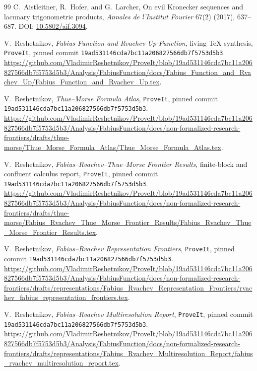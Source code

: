 \documentclass[11pt,oneside]{article}
\numberwithin{equation}{section}
\theoremstyle{definition}
\theoremstyle{remark}
\newcommand{\repo}{\texttt{ProveIt}}
\begin{document}
\begin{thebibliography}{99}
C.~Aistleitner, R.~Hofer, and G.~Larcher,
\newblock On evil Kronecker sequences and lacunary trigonometric products,
\newblock \emph{Annales de l'Institut Fourier} 67(2) (2017), 637--687.
\newblock DOI: \href{https://doi.org/10.5802/aif.3094}{10.5802/aif.3094}.

V.~Reshetnikov,
\newblock \emph{Fabius Function and Rvachev Up-Function}, living TeX synthesis,
\newblock \repo, pinned commit
\nolinkurl{19ad531146cda7bc11a206827566db7f5753d5b3}.
\newblock \url{https://github.com/VladimirReshetnikov/ProveIt/blob/19ad531146cda7bc11a206827566db7f5753d5b3/Analysis/FabiusFunction/docs/Fabius_Function_and_Rvachev_Up/Fabius_Function_and_Rvachev_Up.tex}.

V.~Reshetnikov,
\newblock \emph{Thue--Morse Formula Atlas},
\newblock \repo, pinned commit
\nolinkurl{19ad531146cda7bc11a206827566db7f5753d5b3}.
\newblock \url{https://github.com/VladimirReshetnikov/ProveIt/blob/19ad531146cda7bc11a206827566db7f5753d5b3/Analysis/FabiusFunction/docs/non-formalized-research-frontiers/drafts/thue-morse/Thue_Morse_Formula_Atlas/Thue_Morse_Formula_Atlas.tex}.

V.~Reshetnikov,
\newblock \emph{Fabius--Rvachev--Thue--Morse Frontier Results}, finite-block and
confluent calculus report,
\newblock \repo, pinned commit
\nolinkurl{19ad531146cda7bc11a206827566db7f5753d5b3}.
\newblock \url{https://github.com/VladimirReshetnikov/ProveIt/blob/19ad531146cda7bc11a206827566db7f5753d5b3/Analysis/FabiusFunction/docs/non-formalized-research-frontiers/drafts/thue-morse/Fabius_Rvachev_Thue_Morse_Frontier_Results/Fabius_Rvachev_Thue_Morse_Frontier_Results.tex}.

V.~Reshetnikov,
\newblock \emph{Fabius--Rvachev Representation Frontiers},
\newblock \repo, pinned commit
\nolinkurl{19ad531146cda7bc11a206827566db7f5753d5b3}.
\newblock \url{https://github.com/VladimirReshetnikov/ProveIt/blob/19ad531146cda7bc11a206827566db7f5753d5b3/Analysis/FabiusFunction/docs/non-formalized-research-frontiers/drafts/representations/Fabius_Rvachev_Representation_Frontiers/rvachev_fabius_representation_frontiers.tex}.

V.~Reshetnikov,
\newblock \emph{Fabius--Rvachev Multiresolution Report},
\newblock \repo, pinned commit
\nolinkurl{19ad531146cda7bc11a206827566db7f5753d5b3}.
\newblock \url{https://github.com/VladimirReshetnikov/ProveIt/blob/19ad531146cda7bc11a206827566db7f5753d5b3/Analysis/FabiusFunction/docs/non-formalized-research-frontiers/drafts/representations/Fabius_Rvachev_Multiresolution_Report/fabius_rvachev_multiresolution_report.tex}.


\end{thebibliography}
\end{document}
